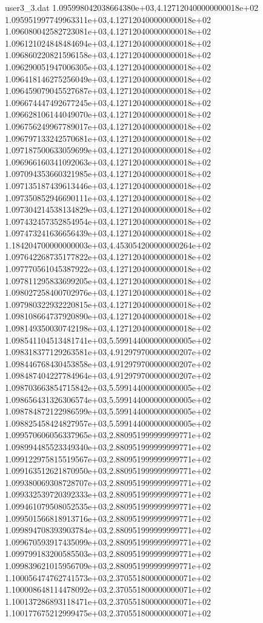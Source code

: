 \begin{filecontents}{user3_3.dat}
1.095998042038664380e+03,4.127120400000000018e+02
1.095951997749963311e+03,4.127120400000000018e+02
1.096080042582723081e+03,4.127120400000000018e+02
1.096121024848484694e+03,4.127120400000000018e+02
1.096860220821596158e+03,4.127120400000000018e+02
1.096290051947006305e+03,4.127120400000000018e+02
1.096418146275256049e+03,4.127120400000000018e+02
1.096459079045527687e+03,4.127120400000000018e+02
1.096674447492677245e+03,4.127120400000000018e+02
1.096628106144049070e+03,4.127120400000000018e+02
1.096756249967789017e+03,4.127120400000000018e+02
1.096797133242570681e+03,4.127120400000000018e+02
1.097187500633059699e+03,4.127120400000000018e+02
1.096966160341092063e+03,4.127120400000000018e+02
1.097094353660321985e+03,4.127120400000000018e+02
1.097135187439613446e+03,4.127120400000000018e+02
1.097350852946690111e+03,4.127120400000000018e+02
1.097304214538134829e+03,4.127120400000000018e+02
1.097432457352854954e+03,4.127120400000000018e+02
1.097473241636656439e+03,4.127120400000000018e+02
1.184204700000000003e+03,4.453054200000000264e+02
1.097642268735177822e+03,4.127120400000000018e+02
1.097770561045387922e+03,4.127120400000000018e+02
1.097811295833699205e+03,4.127120400000000018e+02
1.098027258400702976e+03,4.127120400000000018e+02
1.097980322932220815e+03,4.127120400000000018e+02
1.098108664737920890e+03,4.127120400000000018e+02
1.098149350030742198e+03,4.127120400000000018e+02
1.098541104513481741e+03,5.599144000000000005e+02
1.098318377129263581e+03,4.912979700000000207e+02
1.098446768430453858e+03,4.912979700000000207e+02
1.098487404227784964e+03,4.912979700000000207e+02
1.098703663854715842e+03,5.599144000000000005e+02
1.098656431326306574e+03,5.599144000000000005e+02
1.098784872122986599e+03,5.599144000000000005e+02
1.098825458424827957e+03,5.599144000000000005e+02
1.099570606056337965e+03,2.880951999999999771e+02
1.098994485523349340e+03,2.880951999999999771e+02
1.099122975815519567e+03,2.880951999999999771e+02
1.099163512621870950e+03,2.880951999999999771e+02
1.099380069308728707e+03,2.880951999999999771e+02
1.099332539720392333e+03,2.880951999999999771e+02
1.099461079508052535e+03,2.880951999999999771e+02
1.099501566818913716e+03,2.880951999999999771e+02
1.099894708393903784e+03,2.880951999999999771e+02
1.099670593917435099e+03,2.880951999999999771e+02
1.099799183200585503e+03,2.880951999999999771e+02
1.099839621015956709e+03,2.880951999999999771e+02
1.100056474762741573e+03,2.370551800000000071e+02
1.100008648114478092e+03,2.370551800000000071e+02
1.100137286893118471e+03,2.370551800000000071e+02
1.100177675212999475e+03,2.370551800000000071e+02

\end{filecontents}

